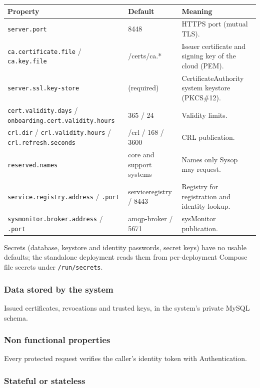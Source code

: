 \documentclass[a4paper]{arrowhead}
\begin{document}
\noindent\begin{longtable}{| p{5.4cm} | p{3.4cm} | p{6.4cm} |} \hline
\rowcolor{gray!33} Property & Default & Meaning \\ \hline \endhead
\texttt{server.port} & 8448 & HTTPS port (mutual TLS). \\ \hline
\texttt{ca.certificate.file} / \texttt{ca.key.file} & /certs/ca.* & Issuer certificate and signing key of the cloud (PEM). \\ \hline
\texttt{server.ssl.key-store} & (required) & Certificate\allowbreak{}Authority system keystore (PKCS\#12). \\ \hline
\texttt{cert.validity.days} / \texttt{onboarding.\allowbreak{}cert.\allowbreak{}validity.\allowbreak{}hours} & 365 / 24 & Validity limits. \\ \hline
\texttt{crl.dir} / \texttt{crl.validity.hours} / \texttt{crl.refresh.seconds} & /crl / 168 / 3600 & CRL publication. \\ \hline
\texttt{reserved.names} & core and support systems & Names only Sysop may request. \\ \hline
\texttt{service.registry.address} / \texttt{.port} & serviceregistry / 8443 & Registry for registration and identity lookup. \\ \hline
\texttt{sysmonitor.broker.address} / \texttt{.port} & amqp-broker / 5671 & sysMonitor publication. \\ \hline
\end{longtable}

Secrets (database, keystore and identity passwords, secret keys) have no usable defaults; the standalone deployment reads them from per-deployment Compose file secrets under \texttt{/\allowbreak{}run/\allowbreak{}secrets}.

\subsubsection{Data stored by the system}

Issued certificates, revocations and trusted keys, in the system's private MySQL schema.

\subsubsection{Non functional properties}

Every protected request verifies the caller's identity token with Authentication.

\subsubsection{Stateful or stateless}
\end{document}
